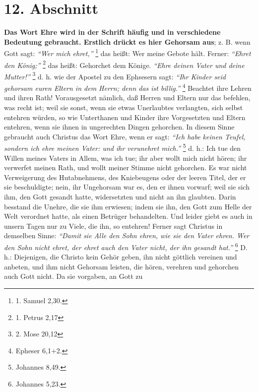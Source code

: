 \section{12. Abschnitt} \label{kap9_ab12}

\label{ref:09_12_ehre}  \textbf{Das Wort Ehre wird in der Schrift
häufig und in verschiedene Bedeutung
gebraucht. Erstlich drückt es hier Gehorsam aus}; z. B. wenn
Gott sagt:
\textit{"`Wer mich ehret,"'}
\footnote{1. Samuel 2,30.}
das heißt: Wer meine Gebote hält. Ferner:
\textit{"`Ehret den König;"'}
\footnote{1. Petrus 2,17}
das heißt: Gehorchet dem Könige.
\textit{"`Ehre deinen Vater und  deine Mutter!"'}
\footnote{2. Mose 20,12}
d. h. wie der
Apostel zu den Ephsesern sagt:
\textit{"`Ihr Kinder seid gehorsam euren Eltern in dem
Herrn; denn das ist billig."'}
\footnote{Epheser 6,1+2.}
Beachtet ihre Lehren und
ihren Rath! Vorausgesetzt nämlich, daß Herren und Eltern nur das befehlen, was
recht ist; weil sie sonst, wenn sie etwas Unerlaubtes verlangten, sich selbst
entehren würden, so wie Unterthanen und Kinder ihre Vorgesetzten und Eltern
entehren, wenn sie ihnen in ungerechten Dingen gehorchen. In diesem Sinne
gebraucht auch Christus das Wort Ehre, wenn er sagt:
\textit{"`Ich habe keinen Teufel,
sondern ich ehre meinen Vater: und ihr verunehret mich."'}
\footnote{Johannes 8,49.}
d. h.: Ich tue den Willen meines Vaters in Allem, was ich tue; ihr aber wollt
mich nicht hören; ihr verwerfet meinen Rath, und wollt meiner Stimme nicht
gehorchen. Es war nicht Verweigerung des Hutabnehmens, des Kniebeugens oder der
leeren Titel, der er sie beschuldigte; nein, ihr Ungehorsam war es, den er ihnen
vorwarf; weil sie sich ihm, den Gott gesandt hatte, widersetzten und nicht an
ihn glaubten. Darin besstand die Unehre, die sie ihm erwiesen; indem sie ihn,
den Gott zum Helle der Welt verordnet hatte, als einen Betrüger behandelten. Und
leider giebt es auch in unsern Tagen nur zu Viele, die ihn, so entehren! Ferner
sagt Christus in demselben Sinne:
\textit{"`Damit sie Alle den Sohn ehren, wie sie den
Vater ehren. Wer den Sohn nicht ehret, der ehret auch den Vater nicht, der ihn
gesandt hat."'}
\footnote{Johannes 5,23.}
D. h.: Diejenigen, die Christo kein Gehör
geben, ihn nicht göttlich vereinen und anbeten, und ihm nicht Gehorsam leisten,
die hören, verehren und gehorchen auch Gott nicht. Da sie vorgaben, an Gott zu
